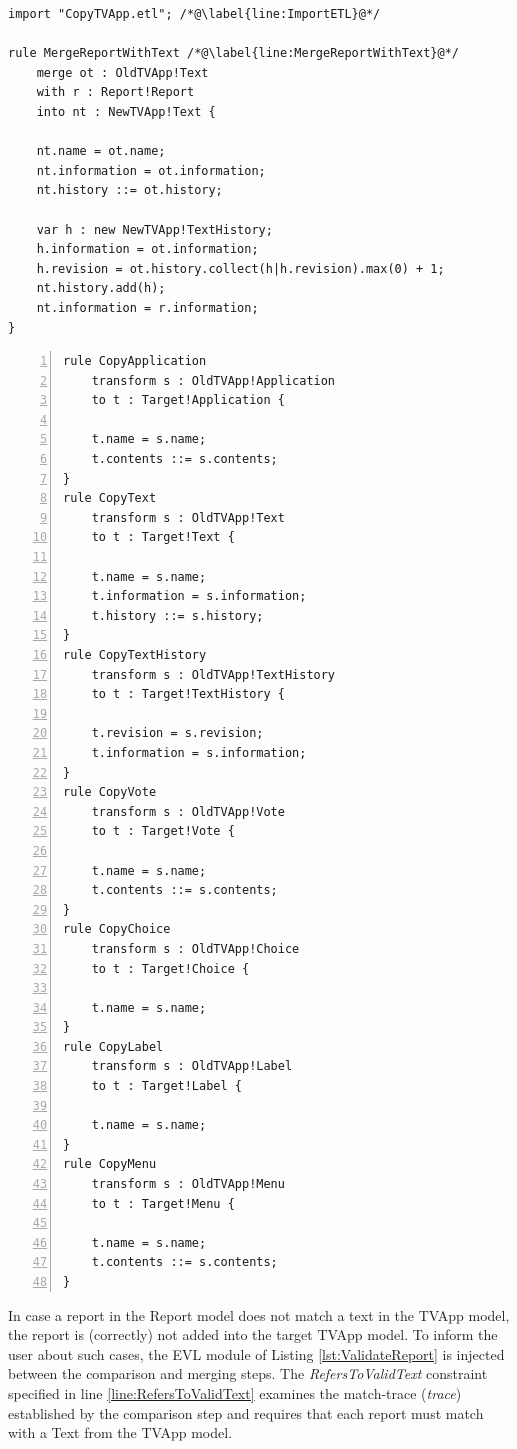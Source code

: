 \begin{lstlisting}[float=tbp, basicstyle=\ttfamily\footnotesize, nolol=true, flexiblecolumns=true, caption=EML module that merges a TVApp with a Report model, tabsize=2, label=lst:CaseStudyEML, language=EML]
import "CopyTVApp.etl"; /*@\label{line:ImportETL}@*/

rule MergeReportWithText /*@\label{line:MergeReportWithText}@*/
	merge ot : OldTVApp!Text
	with r : Report!Report 
	into nt : NewTVApp!Text {
	
	nt.name = ot.name;
	nt.information = ot.information;
	nt.history ::= ot.history;
	
	var h : new NewTVApp!TextHistory;
	h.information = ot.information;
	h.revision = ot.history.collect(h|h.revision).max(0) + 1;
	nt.history.add(h);
	nt.information = r.information;
}
\end{lstlisting}

\begin{lstlisting}[float=tbp, basicstyle=\ttfamily\footnotesize, flexiblecolumns=true, numbers=left, nolol=true, caption=ETL transformation that copies a TVApp module, label=lst:CaseStudyCopyETL, language=ETL, tabsize=2]
rule CopyApplication
	transform s : OldTVApp!Application
	to t : Target!Application {
	
	t.name = s.name;
	t.contents ::= s.contents;
}
rule CopyText
	transform s : OldTVApp!Text
	to t : Target!Text {

	t.name = s.name;
	t.information = s.information;
	t.history ::= s.history;
}
rule CopyTextHistory
	transform s : OldTVApp!TextHistory
	to t : Target!TextHistory {

	t.revision = s.revision;
	t.information = s.information;
}
rule CopyVote
	transform s : OldTVApp!Vote
	to t : Target!Vote {

	t.name = s.name;
	t.contents ::= s.contents;
}
rule CopyChoice
	transform s : OldTVApp!Choice
	to t : Target!Choice {

	t.name = s.name;
}
rule CopyLabel
	transform s : OldTVApp!Label
	to t : Target!Label {

	t.name = s.name;
}
rule CopyMenu
	transform s : OldTVApp!Menu
	to t : Target!Menu {
	
	t.name = s.name;
	t.contents ::= s.contents;
}
\end{lstlisting}

In case a report in the Report model does not match a text in the TVApp model, the report is (correctly) not added into the target TVApp model. To inform the user about such cases, the EVL module of Listing \ref{lst:ValidateReport} is injected between the comparison and merging steps. The \emph{RefersToValidText} constraint specified in line \ref{line:RefersToValidText} examines the match-trace (\emph{trace}) established by the comparison step and requires that each report must match with a Text from the TVApp model.

